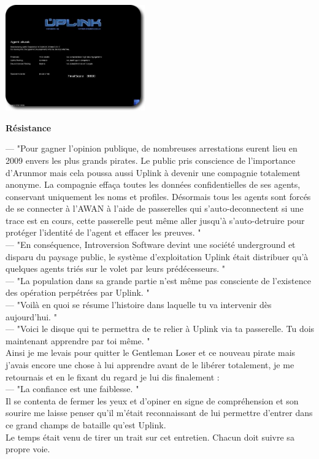 \documentclass[11pt,twoside,a4paper]{book}
\begin{document}
\begin{multicols*}{2}
\begin{center}
	\includegraphics[width=0.45\textwidth]{img/uplinkProfileFinal.png}
\end{center}

\begin{center}
	\textbf{\Large R{\'e}sistance}
\end{center}

 --- "Pour gagner l'opinion publique, de nombreuses arrestations eurent lieu en 2009 envers les plus grands pirates. Le public pris conscience de l'importance d'Arunmor mais cela poussa aussi Uplink {\`a} devenir une compagnie totalement anonyme. La compagnie effa\c{c}a toutes les donn{\'e}es confidentielles de ses agents, conservant uniquement les noms et profiles. D{\'e}sormais tous les agents sont forc{\'e}s de se connecter {\`a} l'AWAN {\`a} l'aide de passerelles qui s'auto-deconnectent si une trace est en cours, cette passerelle peut m{\^e}me aller jusqu'{\`a} s'auto-detruire pour prot{\'e}ger l'identit{\'e} de l'agent et effacer les preuves. "~\\
 --- "En cons{\'e}quence, Introversion Software devint une soci{\'e}t{\'e} underground et disparu du paysage public, le syst{\`e}me d'exploitation Uplink {\'e}tait distribuer qu'{\`a} quelques agents tri{\'e}s sur le volet par leurs pr{\'e}d{\'e}cesseurs. "~\\
 --- "La population dans sa grande partie n'est m{\^e}me pas consciente de l'existence des op{\'e}ration perp{\'e}tr{\'e}es par Uplink. "~\\
 --- "Voil{\`a} en quoi se r{\'e}sume l'histoire dans laquelle tu va intervenir d{\`e}s aujourd'hui. "~\\
 --- "Voici le disque qui te permettra de te relier {\`a} Uplink via ta passerelle. Tu dois maintenant apprendre par toi m{\^e}me. "~\\
Ainsi je me levais pour quitter le Gentleman Loser et ce nouveau pirate mais j'avais encore une chose {\`a} lui apprendre avant de le lib{\'e}rer totalement, je me retournais et en le fixant du regard je lui dis finalement :~\\
 --- "La confiance est une faiblesse. "~\\
Il se contenta de fermer les yeux et d'opiner en signe de compr{\'e}hension et son sourire me laisse penser qu'il m'{\'e}tait reconnaissant de lui permettre d'entrer dans ce grand champs de bataille qu'est Uplink.~\\
Le temps {\'e}tait venu de tirer un trait sur cet entretien. Chacun doit suivre sa propre voie.~\\


\end{multicols*}
\end{document}
